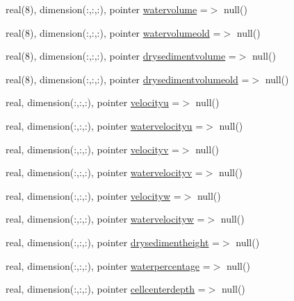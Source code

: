 \begin{DoxyCompactItemize}
\item 
real(8), dimension(\+:,\+:,\+:), pointer \mbox{\hyperlink{structmoduleconsolidation_1_1t__consolidation_a306367512abb849da7df522156343d08}{watervolume}} =$>$ null()
\item 
real(8), dimension(\+:,\+:,\+:), pointer \mbox{\hyperlink{structmoduleconsolidation_1_1t__consolidation_ab77e9cb8658b347dfc8fec12c0da3f2a}{watervolumeold}} =$>$ null()
\item 
real(8), dimension(\+:,\+:,\+:), pointer \mbox{\hyperlink{structmoduleconsolidation_1_1t__consolidation_ae583cebc313d2f8f9d3b61d66d559b0a}{drysedimentvolume}} =$>$ null()
\item 
real(8), dimension(\+:,\+:,\+:), pointer \mbox{\hyperlink{structmoduleconsolidation_1_1t__consolidation_a3d8aeba458d2b11311d3fa4d7fb7997a}{drysedimentvolumeold}} =$>$ null()
\item 
real, dimension(\+:,\+:,\+:), pointer \mbox{\hyperlink{structmoduleconsolidation_1_1t__consolidation_aa7ddd64ca00ea6ce3b4c33763c043912}{velocityu}} =$>$ null()
\item 
real, dimension(\+:,\+:,\+:), pointer \mbox{\hyperlink{structmoduleconsolidation_1_1t__consolidation_a01c4f13a571430479d5881e10a4c9284}{watervelocityu}} =$>$ null()
\item 
real, dimension(\+:,\+:,\+:), pointer \mbox{\hyperlink{structmoduleconsolidation_1_1t__consolidation_aca0258c749bb20f6b115ad5f49f90b91}{velocityv}} =$>$ null()
\item 
real, dimension(\+:,\+:,\+:), pointer \mbox{\hyperlink{structmoduleconsolidation_1_1t__consolidation_a4c9aaf6ccc6e18bf6ce9b01662bb23b6}{watervelocityv}} =$>$ null()
\item 
real, dimension(\+:,\+:,\+:), pointer \mbox{\hyperlink{structmoduleconsolidation_1_1t__consolidation_a9e05c2599acad8ad543a402de87c3914}{velocityw}} =$>$ null()
\item 
real, dimension(\+:,\+:,\+:), pointer \mbox{\hyperlink{structmoduleconsolidation_1_1t__consolidation_a842adae2676c69ff062cc5706eaefd88}{watervelocityw}} =$>$ null()
\item 
real, dimension(\+:,\+:,\+:), pointer \mbox{\hyperlink{structmoduleconsolidation_1_1t__consolidation_ab3cba033d5bf1a9e5c6658c668f56460}{drysedimentheight}} =$>$ null()
\item 
real, dimension(\+:,\+:,\+:), pointer \mbox{\hyperlink{structmoduleconsolidation_1_1t__consolidation_a545a27a02ac3ef60e3356b2dc2295828}{waterpercentage}} =$>$ null()
\item 
real, dimension(\+:,\+:,\+:), pointer \mbox{\hyperlink{structmoduleconsolidation_1_1t__consolidation_a87bd5441d0f2edb8f152f5a29b892a80}{cellcenterdepth}} =$>$ null()

\end{DoxyCompactItemize}

